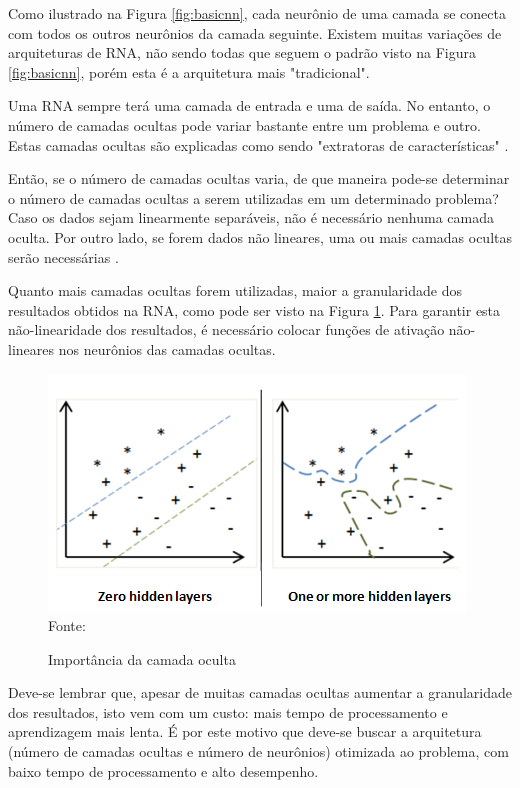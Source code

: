 \documentclass[
	12pt,					%
	openright,				%
	oneside,				%
	a4paper,				%
	bibjustif,				%
	chapter=TITLE,			%
	english,				%
	brazil,					%
	]{abntex2}
\newcommand{\source}[1]{\small Fonte: {#1}}
\begin{document}
	Como ilustrado na Figura \ref{fig:basicnn},
	cada neurônio de uma camada se conecta com todos os outros neurônios da camada seguinte.
	Existem muitas variações de arquiteturas de RNA,
	não sendo todas que seguem o padrão visto na Figura \ref{fig:basicnn},
	porém esta é a arquitetura mais "tradicional"{}.
	
	Uma RNA sempre terá uma camada de entrada e uma de saída.
	No entanto, o número de camadas ocultas pode variar bastante entre um problema e outro.
	Estas camadas ocultas são explicadas como sendo "extratoras de características"{}
	\cite{stackExchange2}.
	
	Então, se o número de camadas ocultas varia,
	de que maneira pode-se determinar o número de camadas ocultas a serem utilizadas em um determinado problema?
	Caso os dados sejam linearmente separáveis,
	não é necessário nenhuma camada oculta.
	Por outro lado, se forem dados não lineares,
	uma ou mais camadas ocultas serão necessárias
	\cite{stackExchange1}.
	
	Quanto mais camadas ocultas forem utilizadas,
	maior a granularidade dos resultados obtidos na RNA,
	como pode ser visto na Figura \ref{fig:nnhiddenlayer}.
	Para garantir esta não-linearidade dos resultados, %
	é necessário colocar funções de ativação não-lineares nos neurônios das camadas ocultas.
	
	\begin{figure}[ht!]
		\caption{Importância da camada oculta}
		\centering
		\includegraphics[scale=1.5]{img/HiddenLayers.png}\\
		\vspace{0.5mm}
		\source{}
		\label{fig:nnhiddenlayer}
	\end{figure}
	
	Deve-se lembrar que, apesar de muitas camadas ocultas aumentar a granularidade dos resultados,
	isto vem com um custo:
	mais tempo de processamento e
	aprendizagem mais lenta.
	É por este motivo que deve-se buscar a arquitetura (número de camadas ocultas e número de neurônios) otimizada ao problema,
	com baixo tempo de processamento e alto desempenho.
	
\end{document}
